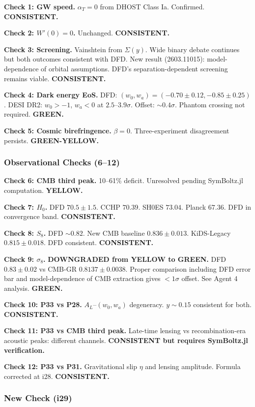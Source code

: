 \documentclass[11pt,a4paper]{article}
\begin{document}
\textbf{Check 1: GW speed.} $\alpha_T = 0$ from DHOST Class Ia. Confirmed. \textbf{CONSISTENT.}

\textbf{Check 2: $W'(0) = 0$.} Unchanged. \textbf{CONSISTENT.}

\textbf{Check 3: Screening.} Vainshtein from $\Sigma(y)$. Wide binary debate continues but both outcomes consistent with DFD. New result (2603.11015): model-dependence of orbital assumptions. DFD's separation-dependent screening remains viable. \textbf{CONSISTENT.}

\textbf{Check 4: Dark energy EoS.} DFD: $(w_0, w_a) = (-0.70 \pm 0.12, -0.85 \pm 0.25)$. DESI DR2: $w_0 > -1$, $w_a < 0$ at $2.5$--$3.9\sigma$. Offset: $\sim 0.4\sigma$. Phantom crossing not required. \textbf{GREEN.}

\textbf{Check 5: Cosmic birefringence.} $\beta = 0$. Three-experiment disagreement persists. \textbf{GREEN-YELLOW.}

\subsubsection{Observational Checks (6--12)}

\textbf{Check 6: CMB third peak.} 10--61\% deficit. Unresolved pending SymBoltz.jl computation. \textbf{YELLOW.}

\textbf{Check 7: $H_0$.} DFD $70.5 \pm 1.5$. CCHP $70.39$. SH0ES $73.04$. Planck $67.36$. DFD in convergence band. \textbf{CONSISTENT.}

\textbf{Check 8: $S_8$.} DFD $\sim 0.82$. New CMB baseline $0.836 \pm 0.013$. KiDS-Legacy $0.815 \pm 0.018$. DFD consistent. \textbf{CONSISTENT.}

\textbf{Check 9: $\sigma_8$.} \textbf{DOWNGRADED from YELLOW to GREEN.} DFD $0.83 \pm 0.02$ vs CMB-GR $0.8137 \pm 0.0038$. Proper comparison including DFD error bar and model-dependence of CMB extraction gives $<1\sigma$ offset. See Agent 4 analysis. \textbf{GREEN.}

\textbf{Check 10: P33 vs P28.} $A_L$--$(w_0, w_a)$ degeneracy. $y \sim 0.15$ consistent for both. \textbf{CONSISTENT.}

\textbf{Check 11: P33 vs CMB third peak.} Late-time lensing vs recombination-era acoustic peaks: different channels. \textbf{CONSISTENT but requires SymBoltz.jl verification.}

\textbf{Check 12: P33 vs P31.} Gravitational slip $\eta$ and lensing amplitude. Formula corrected at i28. \textbf{CONSISTENT.}

\subsubsection{New Check (i29)}
\end{document}
